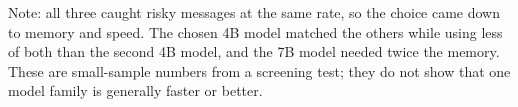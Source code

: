 \begin{table}[H]
\centering
{}

\smallskip
{\footnotesize Note: all three caught risky messages at the same rate, so the choice came down to memory and speed. The chosen 4B model matched the others while using less of both than the second 4B model, and the 7B model needed twice the memory. These are small-sample numbers from a screening test; they do not show that one model family is generally faster or better.}
\caption{Screening test on 33 fixed examples, 11 at each risk level, run before any fine-tuning. It picked a Qwen model that fits the laptop; it is not a result.}
\label{tab:pilot-comparison}
\end{table}
